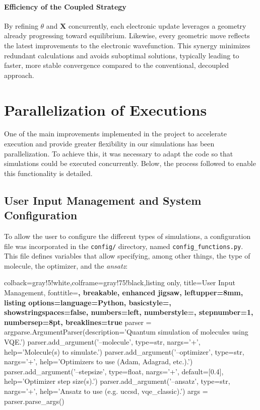 \paragraph{Efficiency of the Coupled Strategy}
By refining \(\theta\) and \(\mathbf{X}\) concurrently, each electronic update leverages a geometry already progressing toward equilibrium. Likewise, every geometric move reflects the latest improvements to the electronic wavefunction. This synergy minimizes redundant calculations and avoids suboptimal solutions, typically leading to faster, more stable convergence compared to the conventional, decoupled approach.

\section{Parallelization of Executions}
One of the main improvements implemented in the project to accelerate execution and provide greater flexibility in our simulations has been parallelization. To achieve this, it was necessary to adapt the code so that simulations could be executed concurrently. Below, the process followed to enable this functionality is detailed.

\subsection{User Input Management and System Configuration}
To allow the user to configure the different types of simulations, a configuration file was incorporated in the \texttt{config/} directory, named \texttt{config\_functions.py}. This file defines variables that allow specifying, among other things, the type of molecule, the optimizer, and the \emph{ansatz}:

\begin{tcblisting}{colback=gray!5!white,colframe=gray!75!black,listing only,
    title=User Input Management, fonttitle=\bfseries, breakable, enhanced jigsaw, leftupper=8mm,
    listing options={language=Python, basicstyle=\ttfamily\small,
    showstringspaces=false, numbers=left, numberstyle=\footnotesize,
    stepnumber=1, numbersep=8pt, breaklines=true}}
parser = argparse.ArgumentParser(description='Quantum simulation of molecules using VQE.')
parser.add_argument('--molecule', type=str, nargs='+', help='Molecule(s) to simulate.')
parser.add_argument('--optimizer', type=str, nargs='+', help='Optimizers to use (Adam, Adagrad, etc.).')
parser.add_argument('--stepsize', type=float, nargs='+', default=[0.4], help='Optimizer step size(s).')
parser.add_argument('--ansatz', type=str, nargs='+', help='Ansatz to use (e.g. uccsd, vqe_classic).')
args = parser.parse_args()
\end{tcblisting}

